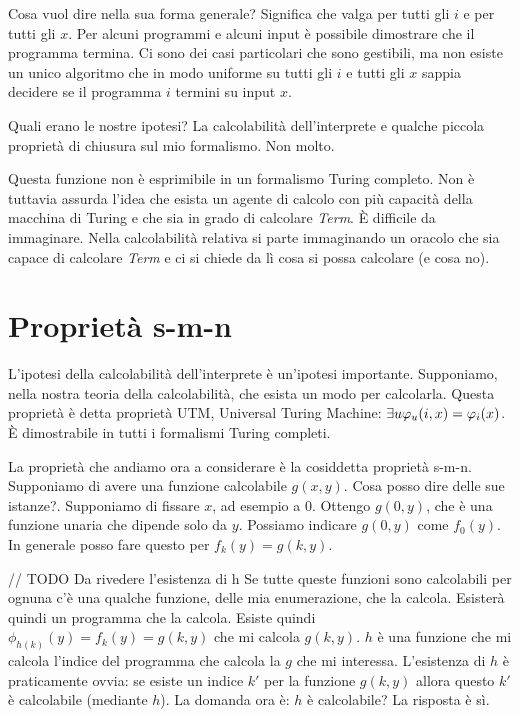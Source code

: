 Cosa vuol dire nella sua forma generale? Significa che valga per tutti gli $i$ e per tutti gli $x$.
Per alcuni programmi e alcuni input è possibile dimostrare che il programma termina. Ci sono dei
casi particolari che sono gestibili, ma non esiste un unico algoritmo che in modo uniforme su tutti
gli $i$ e tutti gli $x$ sappia decidere se il programma $i$ termini su input $x$.

Quali erano le nostre ipotesi? La calcolabilità dell'interprete e qualche piccola proprietà di
chiusura sul mio formalismo. Non molto.

Questa funzione non è esprimibile in un formalismo Turing completo. Non è tuttavia assurda l'idea
che esista un agente di calcolo con più capacità della macchina di Turing e che sia in grado di
calcolare \textit{Term}. È difficile da immaginare. Nella calcolabilità relativa si parte
immaginando un oracolo che sia capace di calcolare \textit{Term} e ci si chiede da lì cosa si possa
calcolare (e cosa no).

\section{Proprietà s-m-n}


L'ipotesi della calcolabilità dell'interprete è un'ipotesi importante. Supponiamo, nella nostra
teoria della calcolabilità, che esista un modo per calcolarla. Questa proprietà è detta proprietà
UTM, Universal Turing Machine: $\exists u \varphi_{u}(i,x) = \varphi_{i}(x)$. È dimostrabile in tutti i
formalismi Turing completi.

La proprietà che andiamo ora a considerare è la cosiddetta proprietà s-m-n. Supponiamo di avere
una funzione calcolabile $g(x,y)$. Cosa posso dire delle sue istanze?. Supponiamo di fissare $x$, ad
esempio a 0. Ottengo $g(0,y)$, che è una funzione unaria che dipende solo da $y$. Possiamo indicare
$g(0,y)$ come $f_{0}(y)$. In generale posso fare questo per $f_{k}(y) = g(k,y)$.

// TODO Da rivedere l'esistenza di h
Se tutte queste funzioni sono calcolabili per ognuna c'è una qualche funzione, delle mia
enumerazione, che la calcola. Esisterà quindi un programma che la calcola. Esiste quindi
$\phi_{h(k)}(y) = f_{k}(y) = g(k,y)$ che mi calcola $g(k,y)$. $h$ è una funzione che mi calcola
l'indice del programma che calcola la $g$ che mi interessa. L'esistenza di $h$ è praticamente ovvia:
se esiste un indice $k'$ per la funzione $g(k,y)$ allora questo $k'$ è calcolabile (mediante $h$).
La domanda ora è: $h$ è calcolabile? La risposta è sì.

